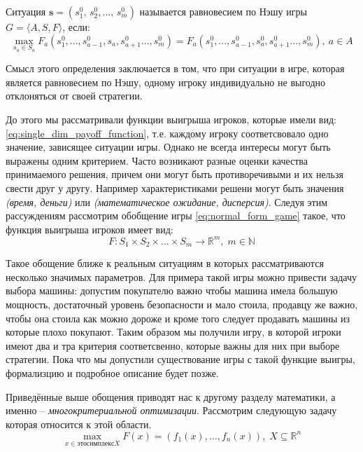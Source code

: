 \begin{Def}
	Ситуация $\textbf{s} = (s_1^0, \, s_2^0, ..., \, s_m^0)$ называется
	равновесием по Нэшу игры 
	$G = \big \langle A, S, F \big \rangle$, если:
	\begin{equation}
		\max \limits_{s_a \in S_a} 
		F_a(s_1^0, ..., s_{a-1}^0, s_a, s_{a+1}^0..., s_m^0)=
		F_a(s_1^0, ..., s_{a-1}^0, s_a^0, s_{a+1}^0..., s_m^0),
		\: a \in A	
		\label{eq:nash_equilibrium}
	\end{equation}
\end{Def}

Смысл этого определения заключается в том, что 
при ситуации в игре, которая является равновесием по Нэшу,
одному игроку индивидуально не выгодно отклоняться от своей стратегии.

До этого мы рассматривали функции выигрыша 
игроков, которые имели вид:
\eqref{eq:single_dim_payoff_function}, т.е. каждому игроку 
соответсвовало одно значение, зависящее ситуации игры.
Однако не всегда интересы могут быть выражены одним критерием. Часто 
возникают разные оценки качества принимаемого решения, причем они могут 
быть противоречивыми и их нельзя свести друг у другу. Например 
характеристиками решени могут быть значения \textit{(время, деньги)} или 
\textit{(математическое ожидание, дисперсия)}. Следуя этим рассуждениям  
рассмотрим обобщение игры \eqref{eq:normal_form_game} такое, что функция
выигрыша игроков имеет вид:
\begin{equation}
	F: S_1 \times S_2 \times ... \times S_m \rightarrow \mathbb R^m
	, \; m \in \mathbb{N}
	\label{eq:multidem_payoff_function}
\end{equation}

Такое обощение ближе к реальным ситуациям
в которых рассматриваются несколько значимых параметров. Для примера 
такой игры можно привести задачу выбора машины: допустим покупателю важно
чтобы машина имела большую мощность, достаточный уровень безопасности 
и мало стоила, продавцу же важно, чтобы она стоила как можно дороже и 
кроме того следует продавать машины из которые плохо покупают. 
Таким образом мы получили игру, в которой игроки имеют два и тра критерия
соответсвенно, которые важны для них при выборе стратегии. 
Пока что мы допустили существование игры с такой
функцие выигры, формализцию и подробное описание будет позже.

Приведённые выше обощения приводят нас к другому разделу
математики, а именно -- \textit{многокритериальной оптимизации}.
Рассмотрим следующую задачу которая относится к этой области.
\begin{equation}
	\max\limits_{x \in это симплекс X} F(x)=({f}_1(x),\ldots, {f}_n(x))
	, \; X \subseteq \mathbb{R}^n	
	\label{eq:multi_criteral_problem}
\end{equation}


